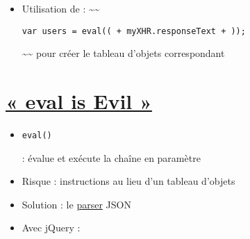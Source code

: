 \begin{itemize}
\tightlist
\item
  Utilisation de : \textasciitilde{}\textasciitilde{}
  \begin{otherlanguage}{english}\texttt{var\ users\ =\ eval(\textquotesingle{}(\textquotesingle{}\ +\ myXHR.responseText\ +\ \textquotesingle{})\textquotesingle{});}\end{otherlanguage}
  \textasciitilde{}\textasciitilde{} pour créer le tableau d'objets
  correspondant
\end{itemize}

\hypertarget{eval-is-evil-22}{%
\section{\texorpdfstring{\href{https://javascriptweblog.wordpress.com/2010/04/19/how-evil-is-eval/}{«
eval is Evil »}}{« eval is Evil »}}\label{eval-is-evil-22}}

\begin{itemize}
\tightlist
\item
  \begin{otherlanguage}{english}\texttt{eval()}\end{otherlanguage} :
  évalue et exécute la chaîne en paramètre
\item
  Risque : instructions au lieu d'un tableau d'objets
\item
  Solution : le
  \href{https://developer.mozilla.org/fr/docs/Web/JavaScript/Reference/Objets_globaux/JSON/parse}{parser}
  JSON
\end{itemize}

\begin{otherlanguage}{english}

\begin{Shaded}
\begin{Highlighting}[]
\OperatorTok{=} \NormalTok{(}\NormalTok{)}\OperatorTok{;}
\OperatorTok{=} \OperatorTok{;}
\end{Highlighting}
\end{Shaded}

\end{otherlanguage}

\begin{itemize}
\tightlist
\item
  Avec jQuery :
\end{itemize}

